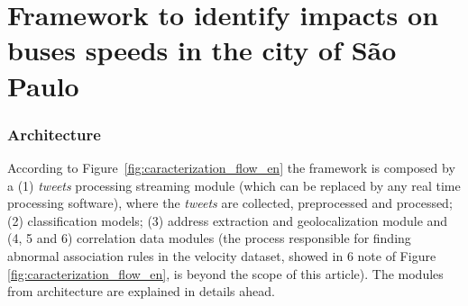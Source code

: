 \documentclass[runningheads]{llncs}
\begin{document}

\section{Framework to identify impacts on buses speeds in the city of São Paulo}

\subsubsection{Architecture}

According to Figure~\ref{fig:caracterization_flow_en} the framework is composed by a (1) \textit{tweets} processing streaming module (which can be replaced by any real time processing software), where the \textit{tweets} are collected, preprocessed and processed; (2) classification models; (3) address extraction and geolocalization module and (4, 5 and 6) correlation data modules (the process responsible for finding abnormal association rules in the velocity dataset, showed in 6 note of Figure \ref{fig:caracterization_flow_en}, is beyond the scope of this article). The modules from architecture are explained in details ahead.
\end{document}
